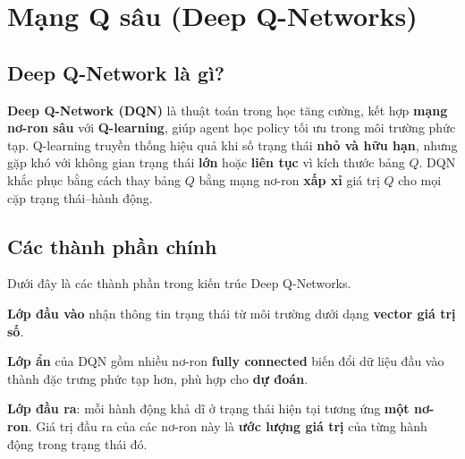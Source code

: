 \section{Mạng Q sâu (Deep Q-Networks)}
\label{sec:deep-q-networks}

\subsection{Deep Q-Network là gì?}

\begin{dinhnghia}[title={Deep Q-Network (DQN)}]
\textbf{Deep Q-Network (DQN)} là thuật toán trong học tăng cường, kết hợp \textbf{mạng nơ-ron sâu} với \textbf{Q-learning}, giúp agent học policy tối ưu trong môi trường phức tạp.
Q-learning truyền thống hiệu quả khi số trạng thái \textbf{nhỏ và hữu hạn}, nhưng gặp khó với không gian trạng thái \textbf{lớn} hoặc \textbf{liên tục} vì kích thước bảng $Q$.
DQN khắc phục bằng cách thay bảng $Q$ bằng mạng nơ-ron \textbf{xấp xỉ} giá trị $Q$ cho mọi cặp trạng thái--hành động.
\end{dinhnghia}

\subsection{Các thành phần chính}

\begin{ynghia}[title={Kiến trúc DQN}]
Dưới đây là các thành phần trong kiến trúc Deep Q-Networks.
\end{ynghia}

\begin{phuongphap}[title={Lớp đầu vào (Input Layer)}]
\textbf{Lớp đầu vào} nhận thông tin trạng thái từ môi trường dưới dạng \textbf{vector giá trị số}.
\end{phuongphap}

\begin{phuongphap}[title={Lớp ẩn (Hidden Layers)}]
\textbf{Lớp ẩn} của DQN gồm nhiều nơ-ron \textbf{fully connected} biến đổi dữ liệu đầu vào thành đặc trưng phức tạp hơn, phù hợp cho \textbf{dự đoán}.
\end{phuongphap}

\begin{phuongphap}[title={Lớp đầu ra (Output Layer)}]
\textbf{Lớp đầu ra}: mỗi hành động khả dĩ ở trạng thái hiện tại tương ứng \textbf{một nơ-ron}.
Giá trị đầu ra của các nơ-ron này là \textbf{ước lượng giá trị} của từng hành động trong trạng thái đó.
\end{phuongphap}

